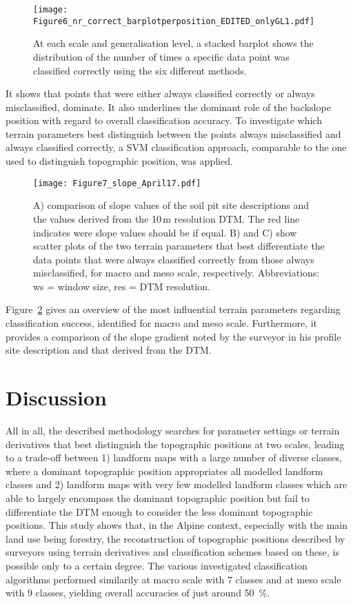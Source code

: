 \documentclass[preprint,12pt,authoryear]{elsarticle}
\begin{document}
\begin{figure}
\texttt{[image: Figure6\_nr\_correct\_barplotperposition\_EDITED\_onlyGL1.pdf]}
\caption{At each scale and generalisation level, a stacked barplot shows the distribution of the number of times a specific data point was classified correctly using the six different methods.}
\label{fig:hist_correct_per_tp}
\end{figure}

It shows that points that were either always classified correctly or always misclassified, dominate. It also underlines the dominant role of the backslope position with regard to overall classification accuracy. To investigate which terrain parameters best distinguish between the points always misclassified and always classified correctly, a SVM classification approach, comparable to the one used to distinguish topographic position, was applied.
\begin{figure}
\texttt{[image: Figure7\_slope\_April17.pdf]}
\caption{A) comparison of slope values of the soil pit site descriptions and the  values derived from the 10\,m resolution DTM. The red line indicates were slope values should be if equal. B) and C) show scatter plots of the two terrain parameters that best differentiate the data points that were always classified correctly from those always misclassified, for macro and meso scale, respectively. Abbreviations: ws = window size, res = DTM resolution.}
\label{fig:slope}
\end{figure}
 Figure~\ref{fig:slope} gives an overview of the most influential terrain parameters regarding classification success, identified for macro and meso scale. Furthermore, it provides a comparison of the slope gradient noted by the surveyor in his profile site description and that derived from the DTM.




\section{Discussion}
All in all, the described methodology searches for parameter settings or terrain derivatives that best distinguish the topographic positions at two scales, leading to a trade-off between 1) landform maps with a large number of diverse classes, where a dominant topographic position appropriates all modelled landform classes and 2) landform maps with very few modelled landform classes which are able to largely encompass the dominant topographic position but fail to differentiate the DTM enough to consider the less dominant topographic positions.
This study shows that, in the Alpine context, especially with the main land use being forestry, the reconstruction of topographic positions described by surveyors using terrain derivatives and classification schemes based on these, is possible only to a certain degree. The various investigated classification algorithms performed similarily at macro scale with 7 classes and at meso scale with 9 classes, yielding overall accuracies of just around 50~\%.
\end{document}
